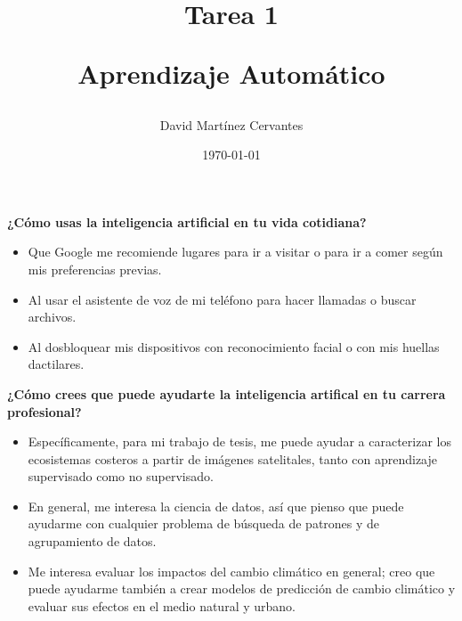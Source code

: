 \documentclass{article}
\title{Tarea 1 \\
\begin{large} 
    Aprendizaje Automático
  \end{large} }
\author{David Martínez Cervantes}
\affil{Centro de Investigación en Ciencias de Información Geoespacial}
\date{\today}
\begin{document}
\maketitle

\textbf{¿Cómo usas la inteligencia artificial en tu vida cotidiana?}

    \begin{itemize}
        
        \item Que Google me recomiende lugares para ir a visitar o para ir a comer según mis preferencias previas.
        
        \item Al usar el asistente de voz de mi teléfono para hacer llamadas o buscar archivos.
        
        \item Al dosbloquear mis dispositivos con reconocimiento facial o con mis huellas dactilares.
    
    \end{itemize}


\textbf{¿Cómo crees que puede ayudarte la inteligencia artifical en tu carrera profesional?}

    \begin{itemize}
    
        \item Específicamente, para mi trabajo de tesis, me puede ayudar a caracterizar los ecosistemas costeros a partir de imágenes satelitales, tanto con aprendizaje supervisado como no supervisado.
    
        \item En general, me interesa la ciencia de datos, así que pienso que puede ayudarme con cualquier problema de búsqueda de patrones y de agrupamiento de datos.
    
        \item Me interesa evaluar los impactos del cambio climático en general; creo que puede ayudarme también a crear modelos de predicción de cambio climático y evaluar sus efectos en el medio natural y urbano.
    
    \end{itemize}
\end{document}
